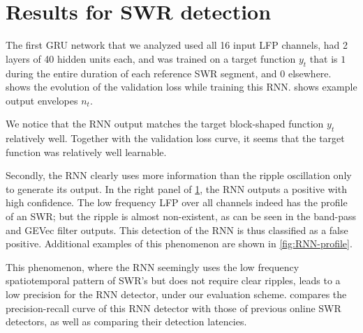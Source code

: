 \section{Results for SWR detection}
\label{sec:RNN-results}

The first GRU network that we analyzed used all 16 input LFP channels, had 2 layers of 40 hidden units each, and was trained on a target function $y_t$ that is $1$ during the entire duration of each reference SWR segment, and $0$ elsewhere.  shows the evolution of the validation loss while training this RNN.  shows example output envelopes $n_t$.

\begin{figure}
\label{fig:RNN-envelopes}
\end{figure}

We notice that the RNN output matches the target block-shaped function $y_t$ relatively well. Together with the validation loss curve, it seems that the target function was relatively well learnable.

Secondly, the RNN clearly uses more information than the ripple oscillation only to generate its output. In the right panel of \cref{fig:RNN-envelopes}, the RNN outputs a positive with high confidence. The low frequency LFP over all channels indeed has the profile of an SWR; but the ripple is almost non-existent, as can be seen in the band-pass and GEVec filter outputs. This detection of the RNN is thus classified as a false positive. Additional examples of this phenomenon are shown in \cref{fig:RNN-profile}.


This phenomenon, where the RNN seemingly uses the low frequency spatiotemporal pattern of SWR's but does not require clear ripples, leads to a low precision for the RNN detector, under our evaluation scheme.  compares the precision-recall curve of this RNN detector with those of previous online SWR detectors, as well as comparing their detection latencies.

\begin{figure}
\\[2.5em]
\label{fig:RNN-PR}
\end{figure}

